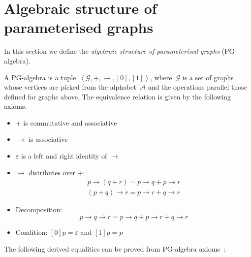 \section{Algebraic structure of parameterised graphs\label{sec:Algebra-of-parametrised}}

In this section we define the \emph{algebraic structure of parameterised graphs}
(PG-algebra).

A PG-algebra is a tuple~$\left\langle \mathcal{G},+,\rightarrow,[0],[1]\right\rangle $,
where~$\mathcal{G}$ is a set of graphs whose vertices are picked
from the alphabet~$\mathcal{A}$ and the operations parallel those
defined for graphs above. The equivalence relation is given by the
following axioms.
\begin{itemize}
\item $+$ is commutative and associative
\item $\rightarrow$ is associative
\item $\varepsilon$ is a left and right identity of $\rightarrow$
\item $\rightarrow$ distributes over $+$:\vspace{-0.3em}
\[
\begin{array}{c}
p\rightarrow(q+r)=p\rightarrow q+p\rightarrow r\\
(p+q)\rightarrow r=p\rightarrow r+q\rightarrow r
\end{array}
\]

\item Decomposition: \vspace{-0.3em}
\[
p\rightarrow q\rightarrow r=p\rightarrow q+p\rightarrow r+q\rightarrow r
\]

\item Condition: $[0]p=\varepsilon$ and $[1]p=p$
\end{itemize}
The following derived equalities can be proved from PG-algebra axioms~\cite[Prop. 2, 3]{2011_mokhov_pg}:
